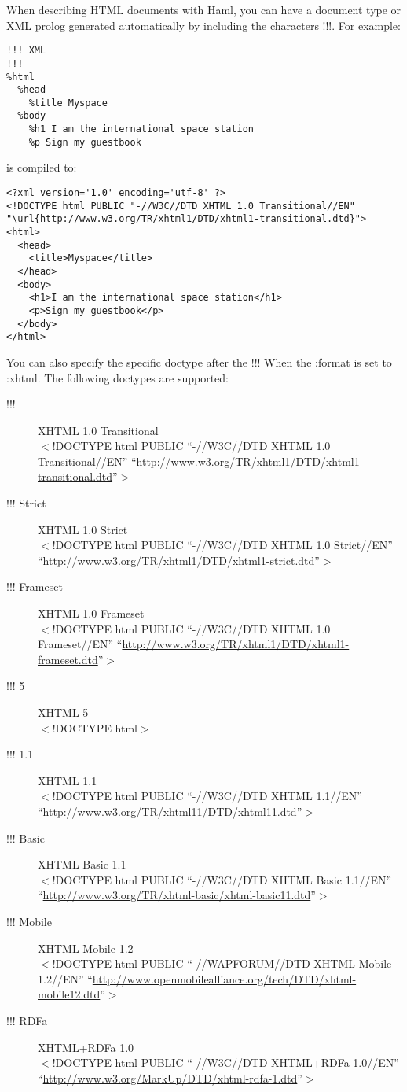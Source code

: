 \documentclass[10pt]{article}
\begin{document}
 When describing HTML documents with Haml, you can have a document type or XML prolog generated automatically by including the characters !!!. For example:
\begin{verbatim}
!!! XML
!!!
%html
  %head
    %title Myspace
  %body
    %h1 I am the international space station
    %p Sign my guestbook
\end{verbatim}


 is compiled to:
\begin{verbatim}
<?xml version='1.0' encoding='utf-8' ?>
<!DOCTYPE html PUBLIC "-//W3C//DTD XHTML 1.0 Transitional//EN" "\url{http://www.w3.org/TR/xhtml1/DTD/xhtml1-transitional.dtd}">
<html>
  <head>
    <title>Myspace</title>
  </head>
  <body>
    <h1>I am the international space station</h1>
    <p>Sign my guestbook</p>
  </body>
</html>
\end{verbatim}


 You can also specify the specific doctype after the !!! When the :format is set to :xhtml. The following doctypes are supported:
\begin{description}
\item[!!!]XHTML 1.0 Transitional\\ 
$<$!DOCTYPE html PUBLIC ``-//W3C//DTD XHTML 1.0 Transitional//EN'' ``\url{http://www.w3.org/TR/xhtml1/DTD/xhtml1-transitional.dtd}''$>$
\item[!!! Strict]XHTML 1.0 Strict\\ 
$<$!DOCTYPE html PUBLIC ``-//W3C//DTD XHTML 1.0 Strict//EN'' ``\url{http://www.w3.org/TR/xhtml1/DTD/xhtml1-strict.dtd}''$>$
\item[!!! Frameset]XHTML 1.0 Frameset\\ 
$<$!DOCTYPE html PUBLIC ``-//W3C//DTD XHTML 1.0 Frameset//EN'' ``\url{http://www.w3.org/TR/xhtml1/DTD/xhtml1-frameset.dtd}''$>$
\item[!!! 5]XHTML 5\\ 
$<$!DOCTYPE html$>$\\ 

\item[!!! 1.1]XHTML 1.1\\ 
$<$!DOCTYPE html PUBLIC ``-//W3C//DTD XHTML 1.1//EN'' ``\url{http://www.w3.org/TR/xhtml11/DTD/xhtml11.dtd}''$>$
\item[!!! Basic]XHTML Basic 1.1\\ 
$<$!DOCTYPE html PUBLIC ``-//W3C//DTD XHTML Basic 1.1//EN'' ``\url{http://www.w3.org/TR/xhtml-basic/xhtml-basic11.dtd}''$>$ 
\item[!!! Mobile]XHTML Mobile 1.2\\ 
$<$!DOCTYPE html PUBLIC ``-//WAPFORUM//DTD XHTML Mobile 1.2//EN'' ``\url{http://www.openmobilealliance.org/tech/DTD/xhtml-mobile12.dtd}''$>$
\item[!!! RDFa]XHTML+RDFa 1.0\\ 
$<$!DOCTYPE html PUBLIC ``-//W3C//DTD XHTML+RDFa 1.0//EN'' ``\url{http://www.w3.org/MarkUp/DTD/xhtml-rdfa-1.dtd}''$>$

\end{description}
\end{document}
